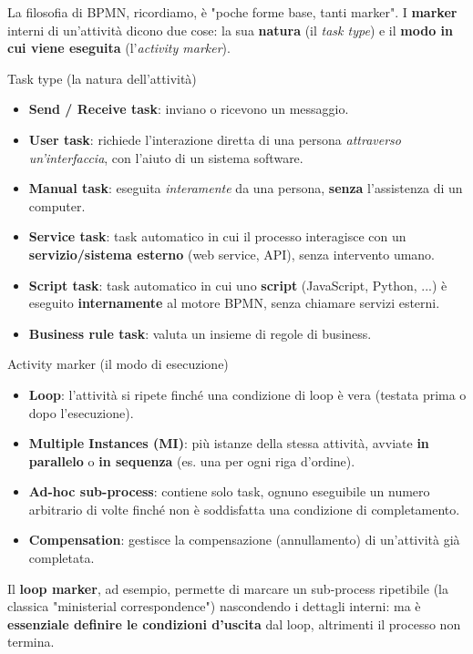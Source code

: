 La filosofia di BPMN, ricordiamo, è "poche forme base, tanti marker". I \textbf{marker} interni di un'attività dicono due cose: la sua \textbf{natura} (il \emph{task type}) e il \textbf{modo in cui viene eseguita} (l'\emph{activity marker}).

\begin{boxdefinition}{Task type (la natura dell'attività)}
\begin{itemize}
\item \textbf{Send / Receive task}: inviano o ricevono un messaggio.
\item \textbf{User task}: richiede l'interazione diretta di una persona \emph{attraverso un'interfaccia}, con l'aiuto di un sistema software.
\item \textbf{Manual task}: eseguita \emph{interamente} da una persona, \textbf{senza} l'assistenza di un computer.
\item \textbf{Service task}: task automatico in cui il processo interagisce con un \textbf{servizio/sistema esterno} (web service, API), senza intervento umano.
\item \textbf{Script task}: task automatico in cui uno \textbf{script} (JavaScript, Python, ...) è eseguito \textbf{internamente} al motore BPMN, senza chiamare servizi esterni.
\item \textbf{Business rule task}: valuta un insieme di regole di business.
\end{itemize}
\end{boxdefinition}

\begin{boxdefinition}{Activity marker (il modo di esecuzione)}
\begin{itemize}
\item \textbf{Loop}: l'attività si ripete finché una condizione di loop è vera (testata prima o dopo l'esecuzione).
\item \textbf{Multiple Instances (MI)}: più istanze della stessa attività, avviate \textbf{in parallelo} o \textbf{in sequenza} (es. una per ogni riga d'ordine).
\item \textbf{Ad-hoc sub-process}: contiene solo task, ognuno eseguibile un numero arbitrario di volte finché non è soddisfatta una condizione di completamento.
\item \textbf{Compensation}: gestisce la compensazione (annullamento) di un'attività già completata.
\end{itemize}
\end{boxdefinition}

Il \textbf{loop marker}, ad esempio, permette di marcare un sub-process ripetibile (la classica "ministerial correspondence") nascondendo i dettagli interni: ma è \textbf{essenziale definire le condizioni d'uscita} dal loop, altrimenti il processo non termina.

